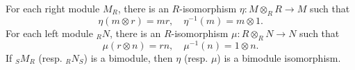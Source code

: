 For each right module $M_R$, there is an $R$-isomorphism $\eta: M \otimes_R R \to M$ such that
$$\eta(m \otimes r) = mr, \quad \eta^{-1}(m) = m \otimes 1.$$
For each left module ${}_R N$, there is an $R$-isomorphism $\mu: R \otimes_R N \to N$ such that
$$\mu(r \otimes n) = rn, \quad \mu^{-1}(n) = 1 \otimes n.$$
If ${}_S M_R$ (resp. ${}_R N_S$) is a bimodule, then $\eta$ (resp. $\mu$) is a bimodule isomorphism.
